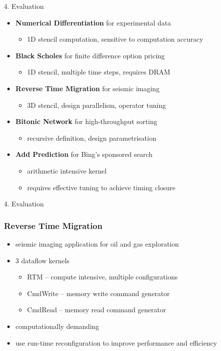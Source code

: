 \begin{frame}{4. Evaluation}

  \begin{itemize}
    \setlength{\itemsep}{10pt}
  \item \textbf{Numerical Differentiation} for experimental data
    \begin{itemize}
    \item 1D stencil computation, sensitive to computation accuracy
    \end{itemize}
  \item \textbf{Black Scholes} for finite difference option pricing
    \begin{itemize}
    \item 1D stencil, multiple time steps, requires DRAM
    \end{itemize}
  \item \textbf{Reverse Time Migration} for seismic imaging
    \begin{itemize}
    \item 3D stencil, design parallelism, operator tuning
    \end{itemize}
  \item \textbf{Bitonic Network} for high-throughput sorting
    \begin{itemize}
    \item recursive definition, design parametrisation
    \end{itemize}
  \item \textbf{Add Prediction} for Bing's sponsored search
    \begin{itemize}
    \item arithmetic intensive kernel
    \item requires effective tuning to achieve timing closure
    \end{itemize}
  \end{itemize}
\end{frame}

\begin{frame}{4. Evaluation}
  \frametitle{Reverse Time Migration}
  \begin{itemize}
  \item seismic imaging application for oil and gas exploration
  \item 3 dataflow kernels
    \begin{itemize}
    \item RTM -- compute intensive, multiple configurations
    \item CmdWrite -- memory write command generator
    \item CmdRead -- memory read command generator
    \end{itemize}
  \item computationally demanding
  \item use run-time reconfiguration to improve performance and efficiency
  \end{itemize}
\end{frame}


